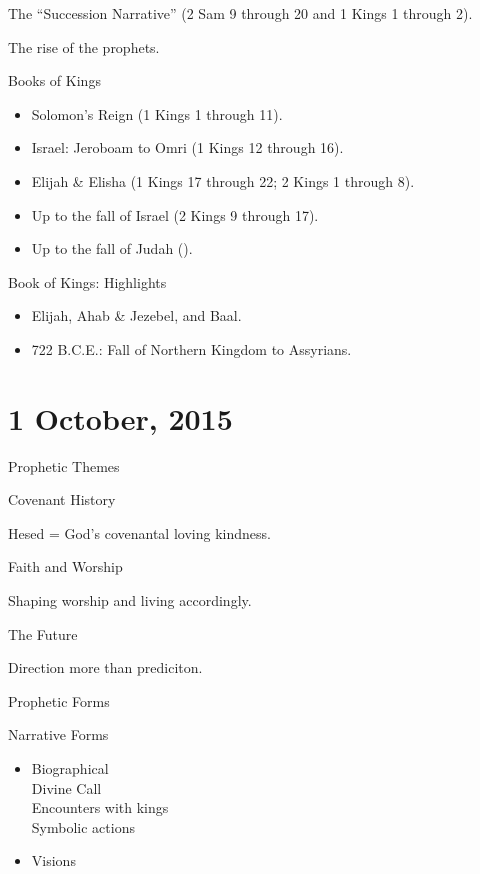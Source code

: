 \documentclass{article}
\begin{document}
    The ``Succession Narrative'' (2 Sam 9 through 20 and 1 Kings 1 through 2).

    The rise of the prophets.

    \centerline{Books of Kings}

    \begin{itemize}
        \item Solomon's Reign (1 Kings 1 through 11).
        \item Israel: Jeroboam to Omri (1 Kings 12 through 16).
        \item Elijah \& Elisha (1 Kings 17 through 22; 2 Kings 1 through 8).
        \item Up to the fall of Israel (2 Kings 9 through 17).
        \item Up to the fall of Judah ().
    \end{itemize}

    \centerline{Book of Kings: Highlights}

    \begin{itemize}
        \item Elijah, Ahab \& Jezebel, and Baal.
        \item 722 B.C.E.: Fall of Northern Kingdom to Assyrians.
    \end{itemize}

\section{1 October, 2015}

    \centerline{Prophetic Themes}

    Covenant History

    Hesed = God's covenantal loving kindness.

    Faith and Worship

    Shaping worship and living accordingly.

    The Future
    
    Direction more than prediciton.

    \centerline{Prophetic Forms}

    Narrative Forms

    \begin{itemize}
        \item Biographical \\
            Divine Call \\
            Encounters with kings \\
            Symbolic actions
        \item Visions
    \end{itemize}
\end{document}

